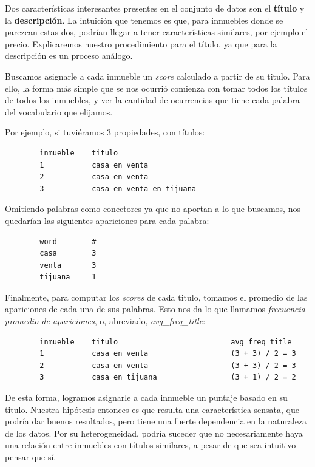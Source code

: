     Dos características interesantes presentes en el conjunto de datos son el \textbf{título} y la \textbf{descripción}. La intuición que tenemos es que, para inmuebles donde se parezcan estas dos, podrían llegar a tener características similares, por ejemplo el precio. Explicaremos nuestro procedimiento para el título, ya que para la descripción es un proceso análogo.
    
    Buscamos asignarle a cada inmueble un \emph{score} calculado a partir de su titulo. Para ello, la forma más simple que se nos ocurrió comienza con tomar todos los títulos de todos los inmuebles, y ver la cantidad de ocurrencias que tiene cada palabra del vocabulario que elijamos.
    
    Por ejemplo, si tuviéramos 3 propiedades, con títulos:
    
    \begin{verbatim}
        inmueble    titulo
        1           casa en venta
        2           casa en venta
        3           casa en venta en tijuana
    \end{verbatim}

    Omitiendo palabras como conectores ya que no aportan a lo que buscamos, nos quedarían las siguientes apariciones para cada palabra:
    
    \begin{verbatim}
        word        #
        casa        3
        venta       3
        tijuana     1
    \end{verbatim}
    
    Finalmente, para computar los \emph{scores} de cada titulo, tomamos el promedio de las apariciones de cada una de sus palabras. Esto nos da lo que llamamos \textit{frecuencia promedio de apariciones}, o, abreviado, \textit{avg\_freq\_title}:
    
    \begin{verbatim}
        inmueble    titulo                          avg_freq_title
        1           casa en venta                   (3 + 3) / 2 = 3
        2           casa en venta                   (3 + 3) / 2 = 3
        3           casa en tijuana                 (3 + 1) / 2 = 2
    \end{verbatim}
    
    De esta forma, logramos asignarle a cada inmueble un puntaje basado en su titulo.
    Nuestra hipótesis entonces es que resulta una característica sensata, que podría dar buenos resultados, pero tiene una fuerte dependencia en la naturaleza de los datos. Por su heterogeneidad, podría suceder que no necesariamente haya una relación entre inmuebles con títulos similares, a pesar de que sea intuitivo pensar que sí.
    
